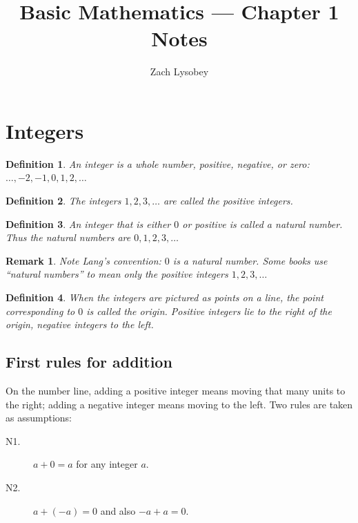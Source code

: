 \documentclass[11pt]{article}
\title{Basic Mathematics --- Chapter 1 Notes}
\author{Zach Lysobey}
\date{}
\newtheorem{definition}{Definition}[section]
\newtheorem*{remark}{Remark}
\begin{document}
\maketitle

\section{Integers}

\begin{definition}
  An \emph{integer} is a whole number, positive, negative, or zero:
  $\ldots, -2, -1, 0, 1, 2, \ldots$
\end{definition}

\begin{definition}
  The integers $1, 2, 3, \ldots$ are called the \emph{positive integers}.
\end{definition}

\begin{definition}
  An integer that is either $0$ or positive is called a \emph{natural
  number}. Thus the natural numbers are $0, 1, 2, 3, \ldots$
\end{definition}

\begin{remark}
  Note Lang's convention: $0$ \emph{is} a natural number. Some books use
  ``natural numbers'' to mean only the positive integers $1, 2, 3, \ldots$
\end{remark}

\begin{definition}
  When the integers are pictured as points on a line, the point
  corresponding to $0$ is called the \emph{origin}. Positive integers lie
  to the right of the origin, negative integers to the left.
\end{definition}

\subsection*{First rules for addition}

On the number line, adding a positive integer means moving that many
units to the right; adding a negative integer means moving to the left.
Two rules are taken as assumptions:

\begin{description}
  \item[N1.] $a + 0 = a$ \quad for any integer $a$.
  \item[N2.] $a + (-a) = 0$ \quad and also \quad $-a + a = 0$.
\end{description}
\end{document}
